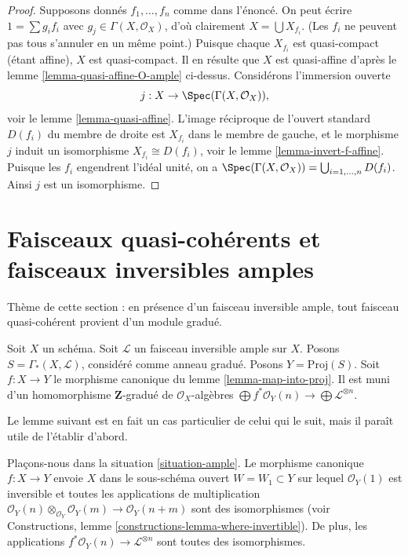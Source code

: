 \begin{proof}
Supposons donnés $f_1, \ldots, f_n$ comme dans l'énoncé.
On peut écrire $1 = \sum g_i f_i$ avec $g_j \in \Gamma(X, \mathcal{O}_X)$,
d'où clairement $X = \bigcup X_{f_i}$. (Les $f_i$ ne peuvent
pas tous s'annuler en un même point.) Puisque chaque $X_{f_i}$
est quasi-compact (étant affine), $X$ est quasi-compact.
Il en résulte que $X$ est quasi-affine d'après
le lemme \ref{lemma-quasi-affine-O-ample} ci-dessus.
Considérons l'immersion ouverte
$$
j : X \to \Spec(\Gamma(X, \mathcal{O}_X)),
$$
voir le lemme \ref{lemma-quasi-affine}. L'image réciproque de l'ouvert standard
$D(f_i)$ du membre de droite est $X_{f_i}$ dans le
membre de gauche, et le morphisme $j$ induit un isomorphisme
$X_{f_i} \cong D(f_i)$, voir
le lemme \ref{lemma-invert-f-affine}. Puisque les $f_i$ engendrent l'idéal
unité, on a $\Spec(\Gamma(X, \mathcal{O}_X))
= \bigcup_{i = 1, \ldots, n} D(f_i)$. Ainsi $j$ est un isomorphisme.
\end{proof}







\section{Faisceaux quasi-cohérents et faisceaux inversibles amples}
\label{section-ample-quasi-coherent}

\noindent
Thème de cette section : en présence d'un faisceau inversible ample,
tout faisceau quasi-cohérent provient d'un module gradué.

\begin{situation}
\label{situation-ample}
Soit $X$ un schéma.
Soit $\mathcal{L}$ un faisceau inversible ample sur $X$.
Posons $S = \Gamma_*(X, \mathcal{L})$, considéré comme anneau gradué.
Posons $Y = \text{Proj}(S)$.
Soit $f : X \to Y$ le morphisme canonique du lemme \ref{lemma-map-into-proj}.
Il est muni d'un homomorphisme $\mathbf{Z}$-gradué de $\mathcal{O}_X$-algèbres
$\bigoplus f^*\mathcal{O}_Y(n) \to \bigoplus \mathcal{L}^{\otimes n}$.
\end{situation}

\noindent
Le lemme suivant est en fait un cas particulier de celui
qui le suit, mais il paraît utile de l'établir d'abord.

\begin{lemma}
\label{lemma-ample-gcd-is-one}
Plaçons-nous dans la situation \ref{situation-ample}.
Le morphisme canonique $f : X \to Y$
envoie $X$ dans le sous-schéma ouvert $W = W_1 \subset Y$
sur lequel $\mathcal{O}_Y(1)$ est inversible et toutes les
applications de multiplication
$\mathcal{O}_Y(n) \otimes_{\mathcal{O}_Y} \mathcal{O}_Y(m) \to
\mathcal{O}_Y(n + m)$
sont des isomorphismes
(voir Constructions, lemme \ref{constructions-lemma-where-invertible}).
De plus, les applications $f^*\mathcal{O}_Y(n) \to \mathcal{L}^{\otimes n}$
sont toutes des isomorphismes.
\end{lemma}

